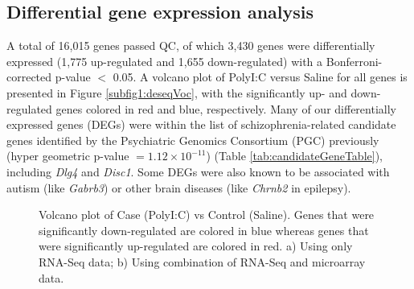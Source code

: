 \subsection{Differential gene expression analysis}
A total of 16,015 genes passed QC, of which 3,430 genes were differentially expressed (1,775 up-regulated and 1,655 down-regulated) with a Bonferroni-corrected p-value $<$ 0.05. 
A volcano plot of PolyI:C versus Saline for all genes is presented in Figure \ref{subfig1:deseqVoc}, with the significantly up- and down-regulated genes colored in red and blue, respectively. 
Many of our differentially expressed genes (DEGs) were within the list of schizophrenia-related candidate genes identified by the Psychiatric Genomics Consortium (PGC)\cite{Greenwood2011} previously (hyper geometric p-value $= 1.12\times 10^{-11}$) (Table \ref{tab:candidateGeneTable}), including \textit{Dlg4}\cite{Balan2013} and \textit{Disc1}\cite{Morris2003}.
Some DEGs were also known to be associated with autism (like \textit{Gabrb3}\cite{Fatemi2009}) or other brain diseases (like \textit{Chrnb2} in epilepsy\cite{Conti2015}).
\begin{figure}[!h]
	\centering     
	\caption[Volcano Plot]{Volcano plot of Case (PolyI:C) vs Control (Saline). 
		Genes that were significantly down-regulated are colored in blue whereas genes that were significantly up-regulated are colored in red. 
		a) Using only RNA-Seq data; 
		b) Using combination of RNA-Seq and microarray data.
	}
\end{figure}


